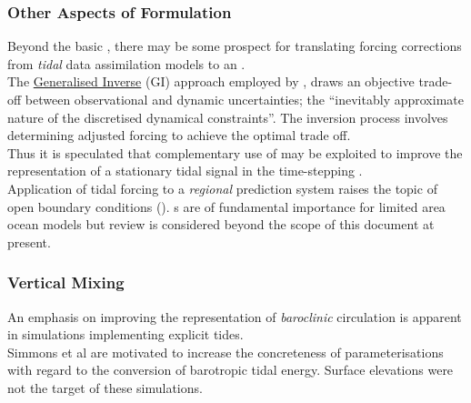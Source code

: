 \subsubsection{Other Aspects of Formulation}
Beyond the basic \ATGP{}, there may be some prospect for translating forcing corrections from \emph{tidal} data assimilation models to an \OGCM{}. \\
The \underline{Generalised Inverse} (GI) \cite[pp345] {Zaron:2011ft} approach employed by \OTIS{} \cite{Egbert:2002ug}, draws an objective trade-off between observational and dynamic uncertainties; the ``inevitably approximate nature of the discretised dynamical constraints''\cite[pp155]{Egbert:1996vr}.  The inversion process involves determining adjusted forcing to achieve the optimal trade off.\\
Thus it is speculated that complementary use of \OTIS{} may be exploited to improve the representation of a stationary tidal signal in the time-stepping \OGCM{}.  \\


Application of tidal forcing to a \emph{regional} prediction system raises the topic of open boundary conditions (\obc{}).  \obc{}s are of fundamental importance for limited area ocean models but review is considered beyond the scope of this document at present.\\


\subsubsection{Vertical Mixing}

An emphasis on improving the representation of \emph{baroclinic} circulation is apparent in \OGCM{} simulations implementing explicit tides.\\
Simmons et al \citep{Simmons:2004fi} are motivated to increase the concreteness of parameterisations with regard to the conversion of barotropic tidal energy.  Surface elevations were not the target of these simulations. \\



